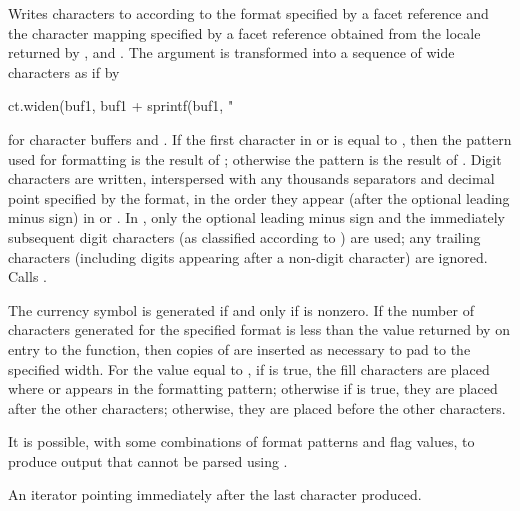 \begin{itemdescr}
\pnum
\effects
Writes characters to
according to the format specified by a
facet reference
and the character mapping specified by a
facet reference
obtained from the locale returned by
,
and
.
The argument
is transformed into a sequence of wide characters as if by

\begin{codeblock}
ct.widen(buf1, buf1 + sprintf(buf1, "%
\end{codeblock}

for character buffers
and
.
If the first character in
or
is equal to
,
then the pattern used for formatting is the result of
;
otherwise the pattern is the result of
.
Digit characters are written, interspersed with any thousands separators
and decimal point specified by the format, in the order they appear
(after the optional leading minus sign)
in
or
.
In
,
only the optional leading minus sign and the immediately subsequent
digit characters (as classified according to
)
are used; any trailing characters (including digits appearing
after a non-digit character) are ignored.
Calls
.

\pnum
\remarks
The currency symbol is generated if and only if
is nonzero.
If the number of characters generated for the specified format is less than the value
returned by
on entry to the function, then copies of
are inserted as necessary to pad to the specified width.
For the value
equal to
,
if
is true, the fill characters are placed where
or
appears in the formatting pattern; otherwise if
is true, they are placed after the other characters;
otherwise, they are placed before the other characters.
\begin{note}
It is possible, with some combinations of format patterns and flag values,
to produce output that cannot be parsed using
.
\end{note}

\pnum
\returns
An iterator pointing immediately after the last character produced.
\end{itemdescr}

